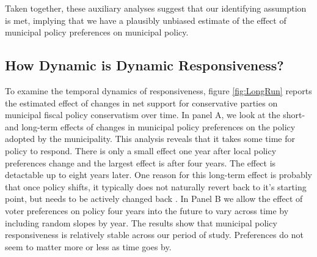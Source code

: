 \documentclass[a4paper,12pt]{article}
\begin{document}
Taken together, these auxiliary analyses suggest that our identifying assumption is met, implying that we have a plausibly unbiased estimate of the effect of municipal policy preferences on municipal policy.

\subsection*{How Dynamic is Dynamic Responsiveness?}

To examine the temporal dynamics of responsiveness, figure \ref{fig:LongRun} reports the estimated effect of changes in net support for conservative parties on municipal fiscal policy conservatism over time. In panel A, we look at the short- and long-term effects of changes in municipal policy preferences on the policy adopted by the municipality. This analysis reveals that it takes some time for policy to respond. There is only a small effect one year after local policy preferences change and the largest effect is after four years. The effect is detactable up to eight years later. One reason for this long-term effect is probably that once policy shifts, it typically does not naturally revert back to it's starting point, but needs to be actively changed back \citep[e.g.,][]{baumgartner2009punctuated}. In Panel B we allow the effect of voter preferences on policy four years into the future to vary across time by including random slopes by year. The results show that municipal policy responsiveness is relatively stable across our period of study. Preferences do not seem to matter more or less as time goes by.
\end{document}
